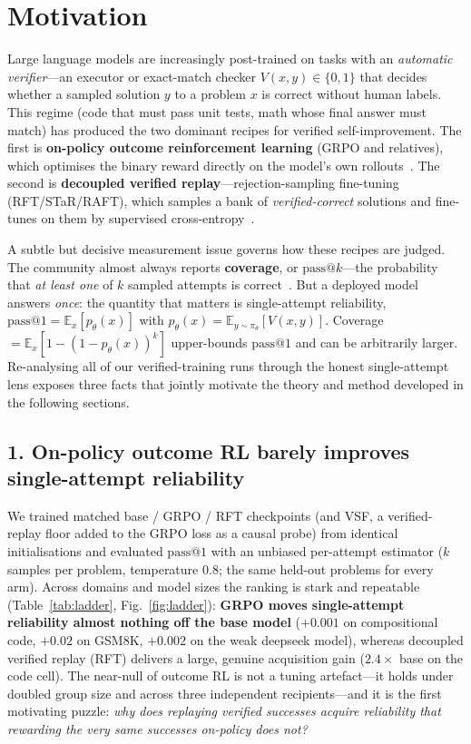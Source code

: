 \section*{Motivation}

Large language models are increasingly post-trained on tasks with an
\emph{automatic verifier}---an executor or exact-match checker $V(x,y)\in\{0,1\}$
that decides whether a sampled solution $y$ to a problem $x$ is correct without
human labels. This regime (code that must pass unit tests, math whose final
answer must match) has produced the two dominant recipes for verified
self-improvement. The first is \textbf{on-policy outcome reinforcement learning}
(GRPO and relatives), which optimises the binary reward directly on the model's
own rollouts~\cite{shao2024deepseekmath}. The second is \textbf{decoupled
verified replay}---rejection-sampling fine-tuning (RFT/STaR/RAFT), which samples
a bank of \emph{verified-correct} solutions and fine-tunes on them by supervised
cross-entropy~\cite{zelikman2022star,dong2023raft}.

A subtle but decisive measurement issue governs how these recipes are judged.
The community almost always reports \textbf{coverage}, or $\text{pass}@k$---the
probability that \emph{at least one} of $k$ sampled attempts is
correct~\cite{chen2021codex}. But a deployed model answers \emph{once}: the
quantity that matters is single-attempt reliability, $\text{pass}@1
=\mathbb{E}_x[p_\theta(x)]$ with $p_\theta(x)=\mathbb{E}_{y\sim\pi_\theta}[V(x,y)]$.
Coverage $=\mathbb{E}_x[1-(1-p_\theta(x))^k]$ upper-bounds $\text{pass}@1$ and
can be arbitrarily larger. Re-analysing all of our verified-training runs through
the honest single-attempt lens exposes three facts that jointly motivate the
theory and method developed in the following sections.

\subsection*{1. On-policy outcome RL barely improves single-attempt reliability}

We trained matched base / GRPO / RFT checkpoints (and VSF, a verified-replay
floor added to the GRPO loss as a causal probe) from identical initialisations
and evaluated $\text{pass}@1$ with an unbiased per-attempt estimator
($k$ samples per problem, temperature $0.8$; the same held-out problems for every
arm). Across domains and model sizes the ranking is stark and repeatable
(Table~\ref{tab:ladder}, Fig.~\ref{fig:ladder}): \textbf{GRPO moves single-attempt
reliability almost nothing off the base model} ($+0.001$ on compositional code,
$+0.02$ on GSM8K, $+0.002$ on the weak deepseek model), whereas decoupled
verified replay (RFT) delivers a large, genuine acquisition gain
($2.4\times$ base on the code cell). The near-null of outcome RL is not a tuning
artefact---it holds under doubled group size and across three independent
recipients---and it is the first motivating puzzle: \emph{why does replaying
verified successes acquire reliability that rewarding the very same successes
on-policy does not?}

